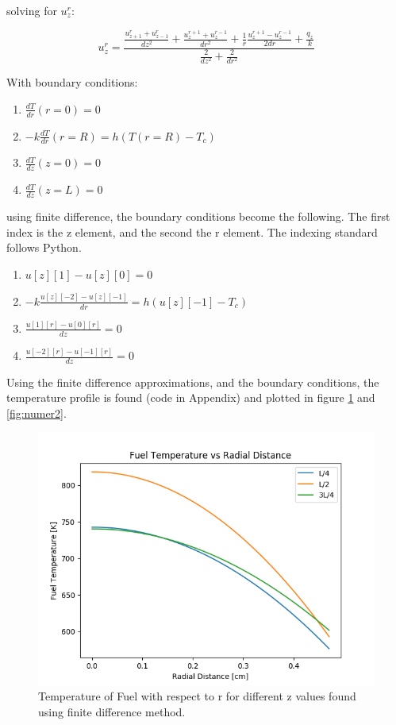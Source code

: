 \documentclass[12pt,letterpaper]{article}
\begin{document}
solving for $u_z^r$:

\[ u_z^r = \frac{\frac{u_{z+1}^r + u_{z-1}^r}{dz^2} + \frac{u^{r+1}_z + u^{r-1}_z}{dr^2}
  + \frac{1}{r} \frac{u^{r+1}_z - u^{r-1}_z}{2dr} + \frac{q_z}{k}}{\frac{2}{dz^2} + \frac{2}{dr^2}} \]

With boundary conditions:

\begin{enumerate}
    \item $\frac{dT}{dr}(r=0) = 0$
    \item $-k \frac{dT}{dr} (r=R) = h(T(r=R) - T_c)$
    \item $\frac{dT}{dz}(z=0) = 0 $
    \item $\frac{dT}{dz}(z=L) = 0 $
\end{enumerate}

using finite difference, the boundary conditions become the following.
The first index is the z element, and the second the r element. The indexing
standard follows Python.
\begin{enumerate}
    \item $u[z][1]-u[z][0] = 0$
    \item $-k \frac{u[z][-2]-u[z][-1]}{dr} = h(u[z][-1] - T_c)$
    \item $ \frac{u[1][r] - u[0][r]}{dz} = 0$
    \item $\frac{u[-2][r] - u[-1][r]}{dz} = 0 $
\end{enumerate}

Using the finite difference approximations, and the boundary conditions,
the temperature profile is found (code in Appendix) and plotted in figure \ref{fig:numer}
and \ref{fig:numer2}.

\begin{figure}[htbp!]
    \begin{center}
        \includegraphics[scale=0.7]{numerical.png}
    \end{center}
    \caption{Temperature of Fuel with respect to r for different z values found using finite difference method.}
    \label{fig:numer}
\end{figure}
\end{document}
